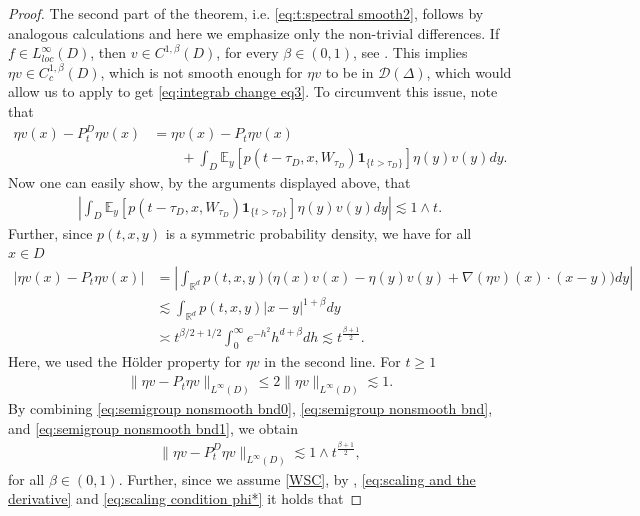 \documentclass[12pt,a4paper,onecolumn]{amsart}
\theoremstyle{definition}
\newcommand{\R}{\mathbb{R}}
\newcommand{\ex}{\mathbb{E}}
\newcommand{\1}{\mathbf 1}
\newcommand{\DD}{\mathcal{D}}
\numberwithin{equation}{section}
\begin{document}
\begin{proof}
The second part of the theorem, i.e. \eqref{eq:t:spectral smooth2}, follows by analogous calculations and here we emphasize only the non-trivial differences. If $f\in L_{loc}^\infty(D)$, then $v\in C^{1,\beta}(D)$, for every $\beta\in (0,1)$, see \cite[Section 2.2]{RosOtonFernRegularBook}. This implies $\eta v\in C^{1,\beta}_{c}(D)$, which is not smooth enough for $\eta v$ to be in $\DD(\Delta)$, which would allow us to apply \cite[Eq. (13.3)]{bernstein} to get \eqref{eq:integrab change eq3}. To circumvent this issue, note that
\begin{align*}
    \eta v(x)-P_t^D\eta v(x)&=\eta v(x)-P_t\eta v(x)\\&\hspace{2em}+\int_D \ex_y\left[p(t-\tau_D,x,W_{\tau_D})\1_{\{t>\tau_D\}}\right]\eta(y)v(y)dy.
\end{align*}
Now one can easily show, by the arguments displayed above, that 
\begin{align}\label{eq:semigroup nonsmooth bnd0}
    \left|\int_D \ex_y\left[p(t-\tau_D,x,W_{\tau_D})\1_{\{t>\tau_D\}}\right]\eta(y)v(y)dy\right|\lesssim 1\wedge t.
\end{align}
Further, since $p(t,x,y)$ is a symmetric  probability density, we have for all $x\in D$
\begin{align}
    |\eta v(x)-P_t\eta v(x)|&=\left|\int_{\R^d}p(t,x,y)\big(\eta(x) v(x)-\eta(y) v(y)+\nabla(\eta v)(x)\cdot(x-y)\big) dy  \right|\nonumber\\
    &\lesssim \int_{\R^d}p(t,x,y)|x-y|^{1+\beta}dy\nonumber\\
    &\asymp t^{\beta/2+1/2}\int_{0}^\infty e^{-h^2}h^{d+\beta}dh\lesssim t^{\frac{\beta+1}{2}}.\label{eq:semigroup nonsmooth bnd}
\end{align}
Here, we used the H\"older property for $\eta v$ in the second line.
For $t\ge 1$ 
\begin{align}\label{eq:semigroup nonsmooth bnd1}
    \|\eta v-P_t\eta v\|_{L^\infty(D)}\le  2\|\eta v\|_{L^\infty(D)}\lesssim 1.
\end{align}
By combining \eqref{eq:semigroup nonsmooth bnd0}, \eqref{eq:semigroup nonsmooth bnd}, and \eqref{eq:semigroup nonsmooth bnd1}, we obtain
\begin{align}\label{eq:nonsmooth final bnd}
    \|\eta v-P_t^D\eta v\|_{L^\infty(D)}\lesssim 1\wedge t^{\frac{\beta+1}{2}},
\end{align}
for all $\beta \in (0,1)$. Further, since we assume \ref{WSC}, by \cite[Eq. (2.13)]{ksv_minimal2016}, \eqref{eq:scaling and the derivative} and \eqref{eq:scaling condition phi*} it holds that  

\end{proof}
\end{document}
